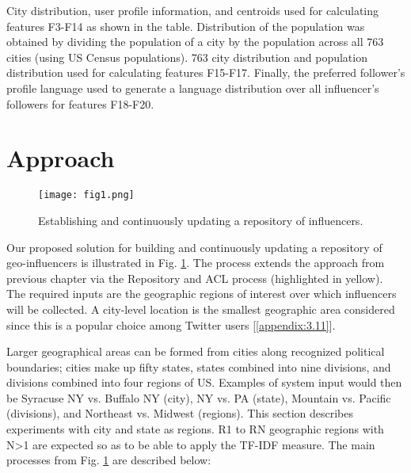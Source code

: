City distribution, user profile information, and centroids used for calculating features F3-F14 as shown in the table. Distribution of the population was obtained by dividing the population of a city by the population across all 763 cities (using US Census populations). 763 city distribution and population distribution used for calculating features F15-F17. Finally, the preferred follower's profile language used to generate a language distribution over all influencer's followers for features F18-F20. 

\section{Approach}

\begin{figure}[htbp]
\centerline{\texttt{[image: fig1.png]}}
\caption{Establishing and continuously updating a repository of influencers.}
\label{fig_ch4_1}
\end{figure}

Our proposed solution for building and continuously updating a repository of geo-influencers is illustrated in Fig.  \ref{fig_ch4_1}. The process extends the approach from previous chapter via the Repository and ACL process (highlighted in yellow). The required inputs are the geographic regions of interest over which influencers will be collected. A city-level location is the smallest geographic area considered since this is a popular choice among Twitter users [\ref{appendix:3.11}]. 

Larger geographical areas can be formed from cities along recognized political boundaries; cities make up fifty states, states combined into nine divisions, and divisions combined into four regions of US. Examples of system input would then be Syracuse NY vs. Buffalo NY (city), NY vs. PA (state), Mountain vs. Pacific (divisions), and Northeast vs. Midwest (regions). This section describes experiments with city and state as regions. R1 to RN geographic regions with N\textgreater1 are expected so as to be able to apply the TF-IDF measure. The main processes from Fig. \ref{fig_ch4_1} are described below:

